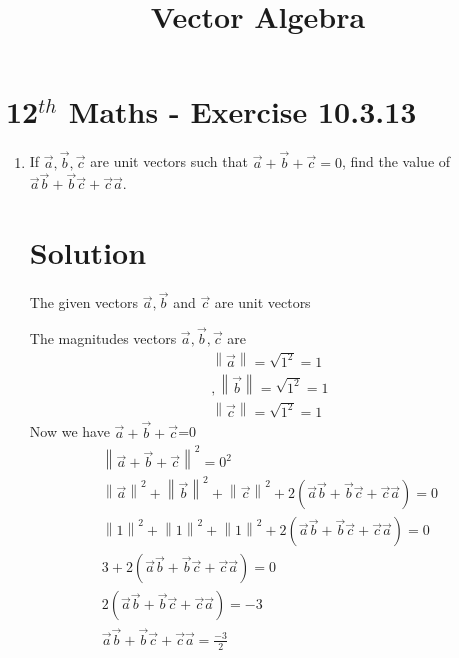 \documentclass[12pt]{article}
\providecommand{\norm}[1]{\left\lVert#1\right\rVert}
\begin{document}
\begin{center}
\title{\textbf{Vector Algebra}}
\date{\vspace{-5ex}} %
\maketitle
\end{center}
\setcounter{page}{1}
\section{12$^{th}$ Maths - Exercise 10.3.13}

\begin{enumerate}
\item If $\overrightarrow{a},\overrightarrow{b},\overrightarrow{c}$ are unit vectors such that $\overrightarrow{a}+\overrightarrow{b}+\overrightarrow{c}=0$, find the value of $\overrightarrow{a}\overrightarrow{b}+\overrightarrow{b}\overrightarrow{c}+\overrightarrow{c}\overrightarrow{a}$. 
\section{Solution}
The given vectors $\overrightarrow{a},\overrightarrow{b}$ and $\overrightarrow{c}$ are unit vectors
		
		The magnitudes vectors $\overrightarrow{a},\overrightarrow{b},\overrightarrow{c}$ are
	\begin{align}
\norm{\overrightarrow{a}} =\sqrt{1^2}=1\\,\norm{\overrightarrow{b}}=\sqrt{1^2}=1\\ \norm{\overrightarrow{c}}=\sqrt{1^2}=1
	\end{align}
Now we have $\overrightarrow{a}+\overrightarrow{b}+\overrightarrow{c}$=0	
\begin{align}
\norm{\overrightarrow{a}+{\overrightarrow{b}}+{\overrightarrow{c}}}^2=0^2\\
\norm{\overrightarrow{a}}^2+\norm{\overrightarrow{b}}^2+\norm{\overrightarrow{c}}^2+2({\overrightarrow{a}}{\overrightarrow{b}}+{\overrightarrow{b}}{\overrightarrow{c}}+{\overrightarrow{c}}{\overrightarrow{a}})=0\\
\norm{1}^2+\norm{1}^2+\norm{1}^2+2({\overrightarrow{a}}{\overrightarrow{b}}+{\overrightarrow{b}}{\overrightarrow{c}}+{\overrightarrow{c}}{\overrightarrow{a}})=0\\
3+2({\overrightarrow{a}}{\overrightarrow{b}}+{\overrightarrow{b}}{\overrightarrow{c}}+{\overrightarrow{c}}{\overrightarrow{a}})=0\\
2({\overrightarrow{a}}{\overrightarrow{b}}+{\overrightarrow{b}}{\overrightarrow{c}}+{\overrightarrow{c}}{\overrightarrow{a}})=-3\\
{\overrightarrow{a}}{\overrightarrow{b}}+{\overrightarrow{b}}{\overrightarrow{c}}+{\overrightarrow{c}}{\overrightarrow{a}}=\frac{-3}{2}
\end{align}
\end{enumerate}
\end{document}
